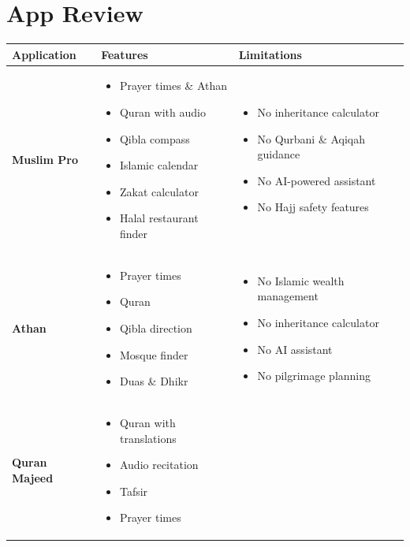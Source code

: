 \documentclass[12pt,a4paper]{article}
\begin{document}
\section{App Review}

\begin{longtable}{|L{2.6cm}|L{5.6cm}|L{5.6cm}|}
\hline
{}
\textbf{Application} & \textbf{Features} & \textbf{Limitations} \\
\hline
\endfirsthead
\endfoot
\hline
\endlastfoot
\textbf{Muslim Pro} &
\begin{itemize}
\item Prayer times \& Athan
\item Quran with audio
\item Qibla compass
\item Islamic calendar
\item Zakat calculator
\item Halal restaurant finder
\end{itemize}
&
\begin{itemize}
\item No inheritance calculator
\item No Qurbani \& Aqiqah guidance
\item No AI-powered assistant
\item No Hajj safety features
\end{itemize}
\\ \hline
\textbf{Athan} &
\begin{itemize}
\item Prayer times
\item Quran
\item Qibla direction
\item Mosque finder
\item Duas \& Dhikr
\end{itemize}
&
\begin{itemize}
\item No Islamic wealth management
\item No inheritance calculator
\item No AI assistant
\item No pilgrimage planning
\end{itemize}
\\ \hline
\textbf{Quran Majeed} &
\begin{itemize}
\item Quran with translations
\item Audio recitation
\item Tafsir
\item Prayer times

\end{itemize}
\end{longtable}
\end{document}
